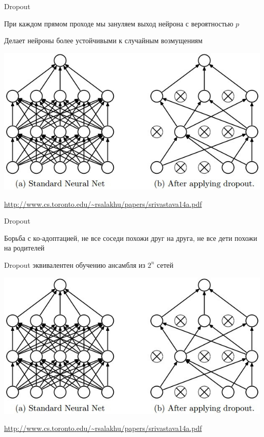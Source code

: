 \documentclass[notes,12pt, aspectratio=169]{beamer}
\newenvironment{wideitemize}{\itemize\addtolength{\itemsep}{10pt}}{\enditemize}
\begin{document}
\begin{frame}{Dropout}
\begin{wideitemize}	
	\item При каждом прямом проходе мы зануляем выход нейрона с вероятностью $p$ 
	\item Делает нейроны более устойчивыми к случайным возмущениям
\end{wideitemize}

\begin{center}
	\includegraphics[width=0.5\paperwidth]{dropout2.png}
\end{center}

\vfill %
\footnotesize
{\color{blue} \url{http://www.cs.toronto.edu/~rsalakhu/papers/srivastava14a.pdf}}
\end{frame}


\begin{frame}{Dropout}
\begin{wideitemize}	
		\item Борьба с ко-адоптацией, не все соседи похожи  друг на друга, не все дети похожи  на родителей
		\item  Dropout эквивалентен обучению ансамбля из $2^n$ сетей
\end{wideitemize}

\begin{center}
	\includegraphics[width=0.5\paperwidth]{dropout2.png}
\end{center}

\vfill %
\footnotesize
{\color{blue} \url{http://www.cs.toronto.edu/~rsalakhu/papers/srivastava14a.pdf}}
\end{frame}
\end{document}
